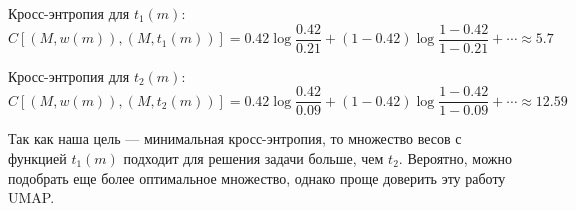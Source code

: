 Кросс-энтропия для $t_1(m)$:
\[C[(M, w(m)), (M, t_1(m))] = 0.42\log \frac{0.42}{0.21} + (1-0.42)\log \frac{1-0.42}{1-0.21} + \cdots \approx 5.7\]

Кросс-энтропия для $t_2(m)$:
\[C[(M, w(m)), (M, t_2(m))] = 0.42\log \frac{0.42}{0.09} + (1-0.42)\log \frac{1-0.42}{1-0.09} + \cdots \approx 12.59\]

Так как наша цель --- минимальная кросс-энтропия, то множество весов с функцией $t_1(m)$ подходит для решения задачи больше, чем $t_2$. Вероятно, можно подобрать еще более оптимальное множество, однако проще доверить эту работу UMAP.
